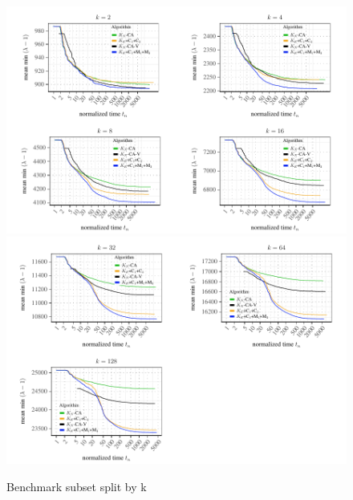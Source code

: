 \documentclass[a4paper,12pt,titlepage, BCOR7mm,headsepline]{scrbook}
\numberwithin{equation}{section}
\begin{document}
\begin{figure}[H]

\begin{center}
\includegraphics[width=\textwidth]{rnw/appendix_convergence-1}
\includegraphics[width=\textwidth]{rnw/appendix_convergence-2}
\caption{Benchmark subset split by k}\label{fig:benchmarkdetailed}
\end{center}

\end{figure}
\end{document}
